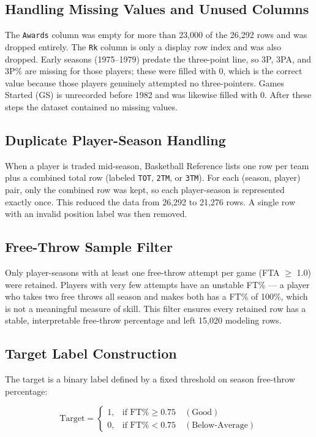 \documentclass[conference]{IEEEtran}
\begin{document}
\subsection{Handling Missing Values and Unused Columns}

The \texttt{Awards} column was empty for more than 23{,}000 of the 26{,}292 rows and was dropped entirely. The \texttt{Rk} column is only a display row index and was also dropped. Early seasons (1975--1979) predate the three-point line, so 3P, 3PA, and 3P\% are missing for those players; these were filled with 0, which is the correct value because those players genuinely attempted no three-pointers. Games Started (GS) is unrecorded before 1982 and was likewise filled with 0. After these steps the dataset contained no missing values.

\subsection{Duplicate Player-Season Handling}

When a player is traded mid-season, Basketball Reference lists one row per team plus a combined total row (labeled \texttt{TOT}, \texttt{2TM}, or \texttt{3TM}). For each (season, player) pair, only the combined row was kept, so each player-season is represented exactly once. This reduced the data from 26{,}292 to 21{,}276 rows. A single row with an invalid position label was then removed.

\subsection{Free-Throw Sample Filter}

Only player-seasons with at least one free-throw attempt per game (FTA $\geq$ 1.0) were retained. Players with very few attempts have an unstable FT\% --- a player who takes two free throws all season and makes both has a FT\% of 100\%, which is not a meaningful measure of skill. This filter ensures every retained row has a stable, interpretable free-throw percentage and left 15{,}020 modeling rows.

\subsection{Target Label Construction}

The target is a binary label defined by a fixed threshold on season free-throw percentage:

\begin{equation}
\text{Target} =
\begin{cases}
1, & \text{if FT\%} \geq 0.75 \quad (\text{Good}) \\
0, & \text{if FT\%} < 0.75 \quad (\text{Below-Average})
\end{cases}
\end{equation}
\end{document}

